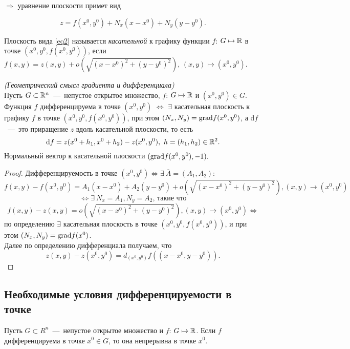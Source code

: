 $\Longrightarrow$ уравнение плоскости примет вид

\begin{equation}\label{eq2}\tag{$\star$}
    z = f(x^0, y^0) + N_x(x-x^0)+N_y(y-y^0).
\end{equation}

Плоскость вида \eqref{eq2} называется \textit{касательной} к графику функции $f$: $G \mapsto \mathbb{R}$ в точке $(x^0, y^0, f(x^0, y^0))$, если $f(x, y) = z(x, y) + o\left( \sqrt{(x-x^0)^2 + (y-y^0)^2}\right)$, $(x, y) \mapsto (x^0, y^0).$

\begin{theorem}
    \textit{(Геометрический смысл градиента и дифференциала)} \\ Пусть $G \subset \mathbb{R}^n$~---~непустое открытое множество, $f$: $G \mapsto \mathbb{R}$ и $(x^0, y^0) \in G$.
    Функция $f$ дифференцируема в точке $(x^0, y^0)$ $\Longleftrightarrow$ $\exists$ касательная плоскость к графику $f$ в точке $(x^0, y^0, f(x^0, y^0))$, при этом $\left(N_x, N_y\right) = \textup{grad}f(x^0, y^0)$, а d$f$~---~это приращение $z$ вдоль касательной плоскости, то есть
    $$\text{d}f = z(x^0 + h_1, x^0 + h_2) - z(x^0, y^0), \ h=(h_1, h_2) \in \mathbb{R}^2.$$
    Нормальный вектор к касательной плоскости $(\textup{grad} f(x^0, y^0), -1).$
\end{theorem}

\begin{proof}
    Дифференцируемость в точке $(x^0, y^0) \Longleftrightarrow \exists \ \overline{A} = (A_1, A_2)$:
    $$f(x, y) -  f(x^0, y^0) = A_1(x-x^0)+A_2(y-y^0)+o\left(\sqrt{\left(x-x^0\right)^2+\left(y-y^0\right)^2}\right), (x, y) \to \left(x^0, y^0\right)$$
    $$\Longleftrightarrow \exists \ N_x=A_1, N_y=A_2 \text{, такие что}$$
    $$f(x, y) - z(x, y) = o(\sqrt{\left(x-x^0\right)^2+\left(y-y^0\right)^2}), (x, y) \to \left(x^0, y^0\right) \Longleftrightarrow$$ 
    по определению $\exists$ касательная плоскость в точке $\left(x^0, y^0, f\left(x^0, y^0\right)\right)$, и при этом $\left(N_x, N_y\right) = \textup{grad}f(x^0)$. \\
    Далее по определению дифференциала получаем, что 
    $$z(x, y) - z(x^0, y^0) = d_{(x^0, y^0)}f((x-x^0, y-y^0)).$$
\end{proof}

\subsection{Необходимые условия дифференцируемости в точке}
\begin{theorem}
    Пусть $G \subset R^n$~---~непустое открытое множество и $f$: $G \mapsto \mathbb{R}$. Если $f$ дифференцируема в точке $x^0 \in G$, то она непрерывна в точке $x^0$.
\end{theorem}

